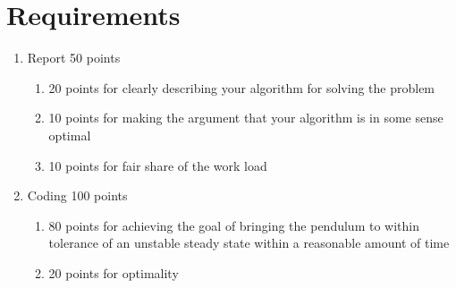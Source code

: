 \documentclass{hitec}
\begin{document}
	\section{Requirements}
	\begin{enumerate}
		\item Report 50 points
		\begin{enumerate}
		\item 20 points for clearly describing your algorithm for solving the problem
		\item 10 points for making the argument that your algorithm is in some sense optimal
		\item 10 points for fair share of the
		work load
		\end{enumerate}
		\item Coding 100 points
		\begin{enumerate}
		\item 80 points for achieving the goal of bringing the pendulum to within tolerance of an unstable steady state within a reasonable amount of time
		\item 20 points for optimality
		\end{enumerate}
	\end{enumerate}
	
	
\end{document}

